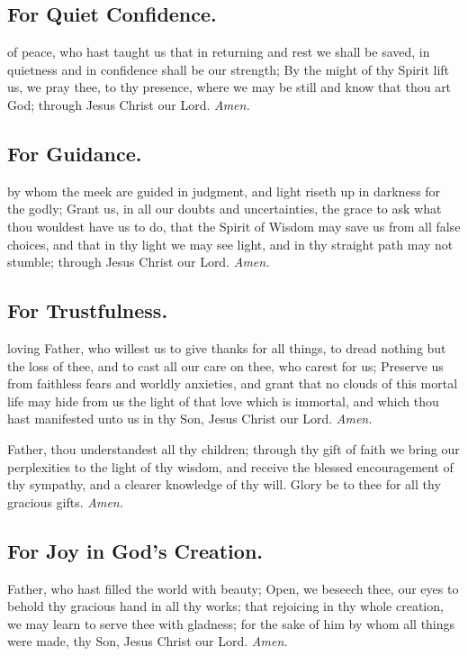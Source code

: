 \subsection{For Quiet Confidence.}
 of peace, who hast taught us that in returning and rest we shall be saved, in quietness and in confidence shall be our strength; By the might of thy Spirit lift us, we pray thee, to thy presence, where we may be still and know that thou art God; through Jesus Christ our Lord. \textit{Amen.}

\subsection{For Guidance.}
 by whom the meek are guided in judgment, and light riseth up in darkness for the godly; Grant us, in all our doubts and uncertainties, the grace to ask what thou wouldest have us to do, that the Spirit of Wisdom may save us from all false choices, and that in thy light we may see light, and in thy straight path may not stumble; through Jesus Christ our Lord. \textit{Amen.}

\subsection{For Trustfulness.}
 loving Father, who willest us to give thanks for all things, to dread nothing but the loss of thee, and to cast all our care on thee, who carest for us; Preserve us from faithless fears and worldly anxieties, and grant that no clouds of this mortal life may hide from us the light of that love which is immortal, and which thou hast manifested unto us in thy Son, Jesus Christ our Lord. \textit{Amen.}

 Father, thou understandest all thy children; through thy gift of faith we bring our perplexities to the light of thy wisdom, and receive the blessed encouragement of thy sympathy, and a clearer knowledge of thy will. Glory be to thee for all thy gracious gifts. \textit{Amen.}

\subsection{For Joy in God's Creation.}
 Father, who hast filled the world with beauty; Open, we beseech thee, our eyes to behold thy gracious hand in all thy works; that rejoicing in thy whole creation, we may learn to serve thee with gladness; for the sake of him by whom all things were made, thy Son, Jesus Christ our Lord. \textit{Amen.}

